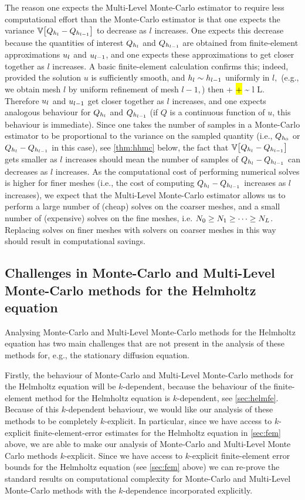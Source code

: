 The reason one expects the Multi-Level Monte-Carlo estimator to require less computational effort than the Monte-Carlo estimator is that one expects the variance $\VAR{\Qhl-\Qhlmo}$ to decrease as $l$ increases. One expects this decrease because the quantities of interest $Q_{h_{l}}$ and $Q_{h_{l-1}}$ are obtained from finite-element approximations $u_{l}$ and $u_{l-1}$, and one expects these approximations to get closer together as $l$ increases. A basic finite-element calculation confirms this; indeed, provided the solution $u$ is sufficiently smooth, and $h_{l} \sim h_{l-1}$ uniformly in $l,$ (e.g., we obtain mesh $l$ by uniform refinement of mesh $l-1,$) then
\beqs
\NHo{\uhl - \uhlmo} \leq {} +  \lesssim \hl + \hlmo \sim \hlmo {}  l \rightarrow L.
\eeqs
Therefore $u_{l}$ and $u_{l-1}$ get closer together as $l$ increases, and one expects analogous behaviour for $Q_{h_{l}}$ and $Q_{h_{l-1}}$ (if $Q$ is a continuous function of $u$, this behaviour is immediate). Since one takes the number of samples in a Monte-Carlo estimator to be proportional to the variance on the sampled quantity (i.e., $Q_{h_{0}}$ or $Q_{h_{l}}-Q_{h_{l-1}}$ in this case), see \cref{thm:hhmc} below, the fact that $\VAR{\Qhl-\Qhlmo}$ gets smaller as $l$ increases should mean the number of samples of $Q_{h_{l}}-Q_{h_{l-1}}$ can decreases as $l$ increases. As the computational cost of performing numerical solves is higher for finer meshes (i.e., the cost of computing $Q_{h_{l}}-Q_{h_{l-1}}$ increases as $l$ increases), we expect that the Multi-Level Monte-Carlo estimator allows us to perform a large number of (cheap) solves on the coarser meshes, and a small number of (expensive) solves on the fine meshes, i.e. $N_{0} \geq N_{1} \geq \cdots \geq N_{L}$. Replacing solves on finer meshes with solvers on coarser meshes in this way should result in computational savings.

\subsection{Challenges in Monte-Carlo and Multi-Level Monte-Carlo methods for the Helmholtz equation}\label{sec:mlmcchallenges}

Analysing Monte-Carlo and Multi-Level Monte-Carlo methods for the Helmholtz equation has two main challenges that are not present in the analysis of these methods for, e.g., the stationary diffusion equation.

Firstly, the behaviour of Monte-Carlo and Multi-Level Monte-Carlo methods for the Helmholtz equation will be $k$-dependent, because the behaviour of the finite-element method for the Helmholtz equation is $k$-dependent, see \cref{sec:helmfe}. Because of this $k$-dependent behaviour, we would like our analysis of these methods to be completely $k$-explicit. In particular, since we have access to $k$-explicit finite-element-error estimates for the Helmholtz equation in \cref{sec:fem} above, we are able to make our analysis of Monte-Carlo and Multi-Level Monte Carlo methods $k$-explicit.  Since we have access to $k$-explicit finite-element error bounds for the Helmholtz equation (see \cref{sec:fem} above) we can re-prove the standard results on computational complexity for Monte-Carlo and Multi-Level Monte-Carlo methods with the $k$-dependence incorporated explicitly.

